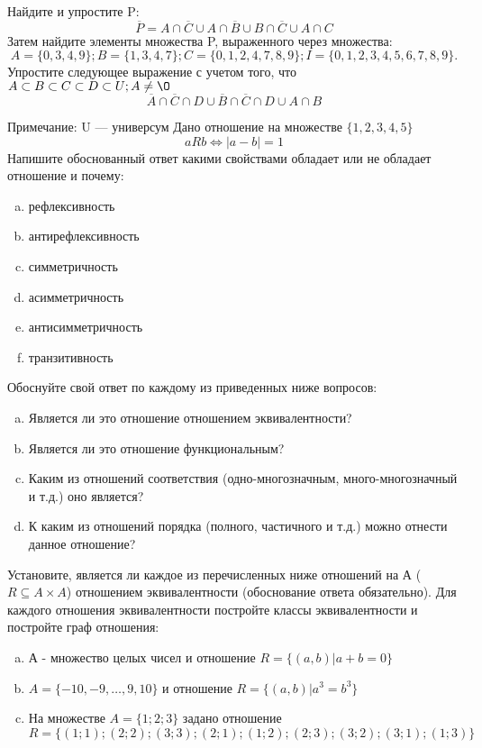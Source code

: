 \documentclass[10pt]{exam}
\begin{document}
\begin{questions}
\question
Найдите и упростите P:
\begin{equation*}
\overline{P} = A \cap \overline{C} \cup A \cap \overline{B} \cup B \cap \overline{C} \cup A \cap C
\end{equation*}
Затем найдите элементы множества P, выраженного через множества:
\begin{equation*}
A = \{0, 3, 4, 9\}; 
B = \{1, 3, 4, 7\};
C = \{0, 1, 2, 4, 7, 8, 9\};
I = \{0, 1, 2, 3, 4, 5, 6, 7, 8, 9\}.
\end{equation*}\question
Упростите следующее выражение с учетом того, что $A\subset B \subset C \subset D \subset U; A \neq \O$
\begin{equation*}
\overline{A} \cap \overline{C} \cap D \cup \overline{B} \cap \overline{C} \cap D \cup A \cap B
\end{equation*}

Примечание: U — универсум\question
Дано отношение на множестве $\{1, 2, 3, 4, 5\}$ 
\begin{equation*}
aRb \iff |a-b| = 1
\end{equation*}
Напишите обоснованный ответ какими свойствами обладает или не обладает отношение и почему:   
\begin{enumerate} [a)]\setcounter{enumi}{0}
\item рефлексивность
\item антирефлексивность
\item симметричность
\item асимметричность
\item антисимметричность
\item транзитивность
\end{enumerate}

Обоснуйте свой ответ по каждому из приведенных ниже вопросов:
\begin{enumerate} [a)]\setcounter{enumi}{0}
    \item Является ли это отношение отношением эквивалентности?
    \item Является ли это отношение функциональным?
    \item Каким из отношений соответствия (одно-многозначным, много-многозначный и т.д.) оно является?
    \item К каким из отношений порядка (полного, частичного и т.д.) можно отнести данное отношение?
\end{enumerate}

\question
Установите, является ли каждое из перечисленных ниже отношений на А ($R \subseteq A \times A$) отношением эквивалентности (обоснование ответа обязательно). Для каждого отношения эквивалентности 
постройте классы эквивалентности и постройте граф отношения:
\begin{enumerate}[a)]\setcounter{enumi}{0}
\item А - множество целых чисел и отношение $R = \{(a,b)|a + b = 0\}$
\item $A = \{-10, -9, …, 9, 10\}$ и отношение $R = \{(a,b)|a^{3} = b^{3}\}$
\item На множестве $A = \{1; 2; 3\}$ задано отношение $R = \{(1; 1); (2; 2); (3; 3); (2; 1); (1; 2); (2; 3); (3; 2); (3; 1); (1; 3)\}$


\end{enumerate}
\end{questions}
\end{document}
